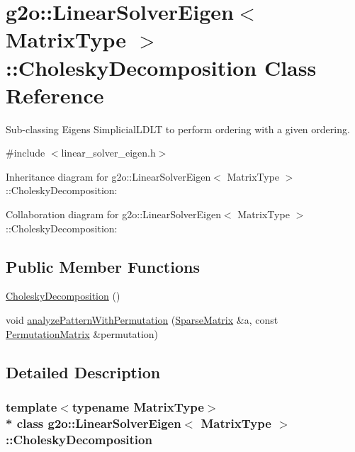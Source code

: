 \hypertarget{classg2o_1_1LinearSolverEigen_1_1CholeskyDecomposition}{}\section{g2o\+:\+:Linear\+Solver\+Eigen$<$ Matrix\+Type $>$\+:\+:Cholesky\+Decomposition Class Reference}
\label{classg2o_1_1LinearSolverEigen_1_1CholeskyDecomposition}


Sub-\/classing Eigen\textquotesingle{}s Simplicial\+L\+D\+LT to perform ordering with a given ordering.  




{\ttfamily \#include $<$linear\+\_\+solver\+\_\+eigen.\+h$>$}



Inheritance diagram for g2o\+:\+:Linear\+Solver\+Eigen$<$ Matrix\+Type $>$\+:\+:Cholesky\+Decomposition\+:


Collaboration diagram for g2o\+:\+:Linear\+Solver\+Eigen$<$ Matrix\+Type $>$\+:\+:Cholesky\+Decomposition\+:
\subsection*{Public Member Functions}
\begin{DoxyCompactItemize}
\item 
\hyperlink{classg2o_1_1LinearSolverEigen_1_1CholeskyDecomposition_a4c82911542773cdcd66b470edb21831e}{Cholesky\+Decomposition} ()
\item 
void \hyperlink{classg2o_1_1LinearSolverEigen_1_1CholeskyDecomposition_a3aa432f9aec0b7230c733df9a4d80558}{analyze\+Pattern\+With\+Permutation} (\hyperlink{classg2o_1_1LinearSolverEigen_aeb7e2400bed3a249b5f29ce7cc00cd33}{Sparse\+Matrix} \&a, const \hyperlink{classg2o_1_1LinearSolverEigen_a86afb924e2b1d3ebd9b9d4a318eded44}{Permutation\+Matrix} \&permutation)
\end{DoxyCompactItemize}


\subsection{Detailed Description}
\subsubsection*{template$<$typename Matrix\+Type$>$\\*
class g2o\+::\+Linear\+Solver\+Eigen$<$ Matrix\+Type $>$\+::\+Cholesky\+Decomposition}

